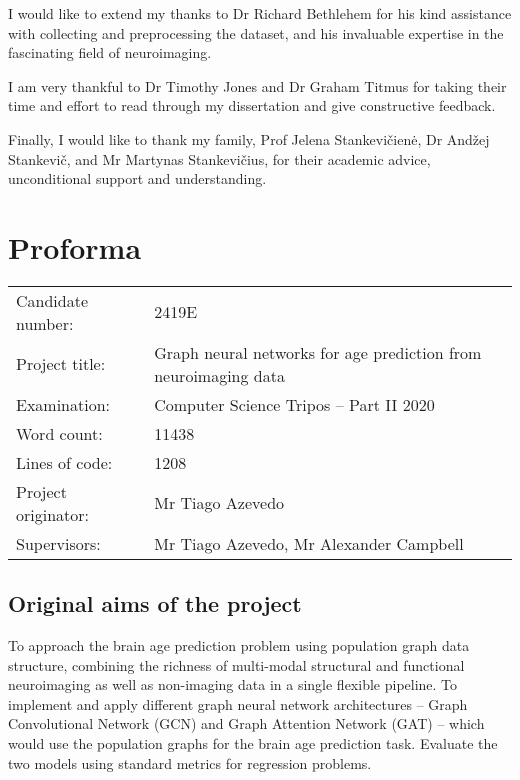 I would like to extend my thanks to Dr Richard Bethlehem for his kind assistance with collecting and preprocessing the dataset, and his invaluable expertise in the fascinating field of neuroimaging.

I am very thankful to Dr Timothy Jones and Dr Graham Titmus for taking their time and effort to read through my dissertation and give constructive feedback.

Finally, I would like to thank my family, Prof Jelena Stankevičienė, Dr Andžej Stankevič, and Mr Martynas Stankevičius, for their academic advice, unconditional support and understanding.


\chapter*{Proforma}

\begin{tabular}{ll}
Candidate number:   & 2419E                  \\
Project title:      & Graph neural networks for age prediction from neuroimaging data \\
Examination:        & Computer Science Tripos -- Part II 2020 \\
Word count:         & 11438\footnotemark[1] \\
Lines of code:      & 1208  \\
Project originator: & Mr Tiago Azevedo                        \\
Supervisors:        & Mr Tiago Azevedo, Mr Alexander Campbell \\ 
\end{tabular}


\section*{Original aims of the project}

To approach the brain age prediction problem using population graph data structure, combining the richness of multi-modal structural and functional neuroimaging as well as non-imaging data in a single flexible pipeline.
To implement and apply different graph neural network architectures – Graph Convolutional Network (GCN) and Graph Attention Network (GAT) – which would use the population graphs for the brain age prediction task. Evaluate the two models using standard metrics for regression problems.

